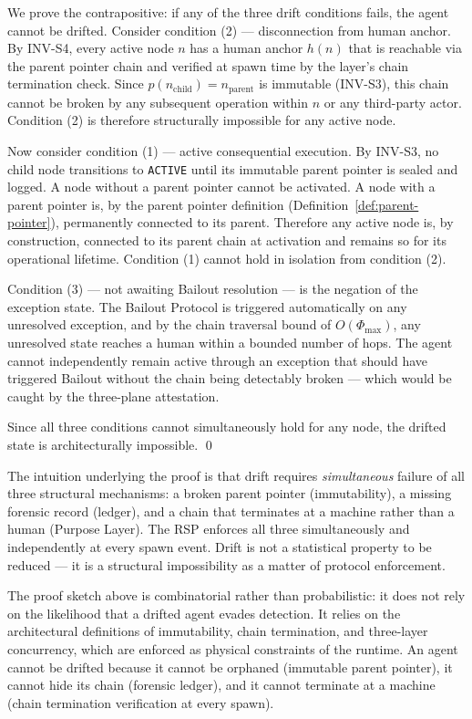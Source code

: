 \begin{Proof}
We prove the contrapositive: if any of the three drift conditions fails, the agent cannot be drifted. Consider condition (2) — disconnection from human anchor. By INV-S4, every active node $n$ has a human anchor $h(n)$ that is reachable via the parent pointer chain and verified at spawn time by the \fact{} layer's chain termination check. Since $p(n_{\text{child}}) = n_{\text{parent}}$ is immutable (INV-S3), this chain cannot be broken by any subsequent operation within $n$ or any third-party actor. Condition (2) is therefore structurally impossible for any active node.

Now consider condition (1) — active consequential execution. By INV-S3, no child node transitions to \texttt{ACTIVE} until its immutable parent pointer is sealed and logged. A node without a parent pointer cannot be activated. A node with a parent pointer is, by the parent pointer definition (Definition~\ref{def:parent-pointer}), permanently connected to its parent. Therefore any active node is, by construction, connected to its parent chain at activation and remains so for its operational lifetime. Condition (1) cannot hold in isolation from condition (2).

Condition (3) — not awaiting Bailout resolution — is the negation of the exception state. The Bailout Protocol is triggered automatically on any unresolved exception, and by the chain traversal bound of $O(\Phi_{\max})$, any unresolved state reaches a human within a bounded number of hops. The agent cannot independently remain active through an exception that should have triggered Bailout without the chain being detectably broken — which would be caught by the three-plane attestation.

Since all three conditions cannot simultaneously hold for any node, the drifted state is architecturally impossible. \qed
\end{Proof}

The intuition underlying the proof is that drift requires \emph{simultaneous} failure of all three structural mechanisms: a broken parent pointer (immutability), a missing forensic record (ledger), and a chain that terminates at a machine rather than a human (Purpose Layer). The RSP enforces all three simultaneously and independently at every spawn event. Drift is not a statistical property to be reduced — it is a structural impossibility as a matter of protocol enforcement.

The proof sketch above is combinatorial rather than probabilistic: it does not rely on the likelihood that a drifted agent evades detection. It relies on the architectural definitions of immutability, chain termination, and three-layer concurrency, which are enforced as physical constraints of the runtime. An agent cannot be drifted because it cannot be orphaned (immutable parent pointer), it cannot hide its chain (forensic ledger), and it cannot terminate at a machine (chain termination verification at every spawn).

